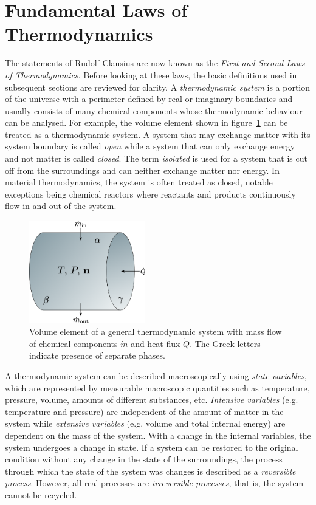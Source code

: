 \section{Fundamental Laws of Thermodynamics}
	The statements of Rudolf Clausius are now known as the \emph{First and Second Laws of Thermodynamics}. Before looking at these laws, the basic definitions used in subsequent sections are reviewed for clarity. A \emph{thermodynamic system} is a portion of the universe with a perimeter defined by real or imaginary boundaries and usually consists of many chemical components whose thermodynamic behaviour can be analysed. For example, the volume element shown in figure~\ref{fig:system} can be treated as a thermodynamic system. A system that may exchange matter with its system boundary is called \emph{open} while a system that can only exchange energy and not matter is called \emph{closed}. The term \emph{isolated} is used for a system that is cut off from the surroundings and can neither exchange matter nor energy. In material thermodynamics, the system is often treated as closed, notable exceptions being chemical reactors where reactants and products continuously flow in and out of the system.
 	\begin{figure}[htb]
		\centering
		\includegraphics[width=0.45\textwidth]{figures/chapter-3/system.png}
		\caption{Volume element of a general thermodynamic system with mass flow of chemical components $\dot{m}$ and heat flux $\dot{Q}$. The Greek letters indicate presence of separate phases.}
		\label{fig:system}
	\end{figure}

	A thermodynamic system can be described macroscopically using \emph{state variables}, which are represented by measurable macroscopic quantities such as temperature, pressure, volume, amounts of different substances, etc. \emph{Intensive variables} (e.g. temperature and pressure)  are independent of the amount of matter in the system  while  \emph{extensive variables} (e.g. volume and total internal energy) are dependent on the mass of the system.  With a change in the internal variables, the system undergoes a change in state. If a system can be restored to the original condition without any change in the state of the surroundings, the process through which the state of the system was changes is described as a \emph{reversible process}. However, all real processes are \emph{irreversible processes}, that is, the system cannot be recycled.

